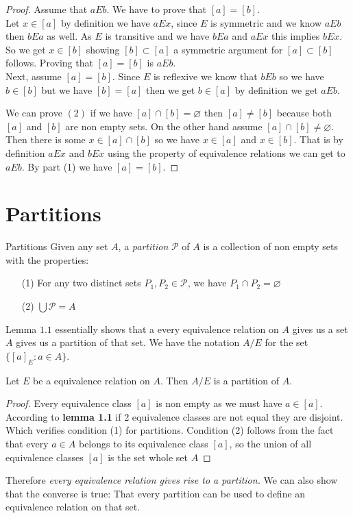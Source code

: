 \documentclass[16pt,a4paper]{article}
\theoremstyle{definition}
\begin{document}
\begin{proof}
Assume that $aEb$. We have to prove that $[a] = [b]$. \\
Let $x\in [a]$ by definition we have $aEx$, since $E$ is symmetric and we know $aEb$ then $bEa$ as well. As $E$ is transitive and we have $bEa$ and $aEx$ this implies $bEx$. So we get $x\in [b]$ showing $[b] \subset [a]$ a symmetric argument for $[a] \subset [b]$ follows. Proving that $[a] = [b]$ is $aEb$. \\
 Next, assume $[a] = [b]$. Since $E$ is reflexive we know that $bEb$ so we have $b\in [b]$ but we have $[b] = [a]$ then we get $b\in [a]$ by definition we get $aEb$. 
 
 
We can prove $(2)$ if we have $[a] \cap [b] = \varnothing$ then $[a] \neq [b]$ because both $[a]$ and $[b]$ are non empty sets. On the other hand assume $[a] \cap [b] \neq \varnothing$. Then there is some $x \in [a] \cap [b]$ so we have $x \in [a]$ and $x\in [b]$. That is by definition $aEx$ and $bEx$ using the property of equivalence relations we can get to $aEb$. By part (1) we have $[a] = [b]$. 
\end{proof}




\newpage
\section{Partitions}
\begin{defn}{Partitions}{}
Given any set $A$, a \textit{partition} $\mathcal{P}$ of $A$ is a collection of  non empty sets with the properties:
\begin{itemize}
\item[(1)] For any two distinct sets $P_1, P_2 \in \mathcal{P}$, we have $P_1 \cap P_2 = \varnothing$
\item[(2)] $\bigcup \mathcal{P} = A$
\end{itemize}{} 
\end{defn}
Lemma $1.1$ essentially shows that a every equivalence relation on $A$ gives us  a set $A$ gives us a partition of that set. We have the notation $A/E$ for the set $\{[a]_E : a \in A\}$. 
\begin{thm}{}{}
Let $E$ be a equivalence relation on $A$. Then $A/E$ is a partition of $A$. 
\end{thm}
\begin{proof}
Every equivalence class $[a]$ is non empty as we must have $a \in [a]$. According to \textbf{lemma 1.1} if 2 equivalence classes are not equal they are disjoint. Which verifies condition (1) for partitions. Condition (2) follows from the fact that every $a\in A$ belongs to its equivalence class $[a]$, so the union of all equivalence classes $[a]$ is the set whole set $A$
\end{proof}
Therefore \emph{every equivalence relation gives rise to a partition.} We can also show that the converse is true: That every partition can be used to define an equivalence relation on that set. 
\end{document}
